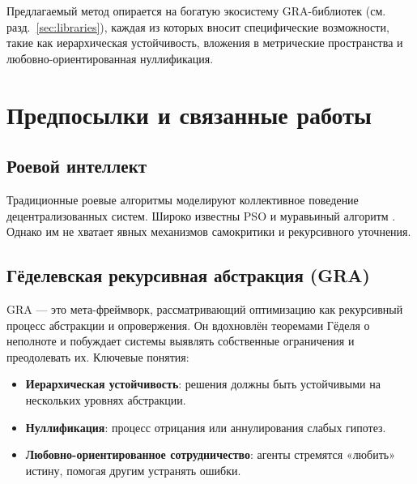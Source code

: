 \documentclass[12pt,a4paper]{article}
\begin{document}
Предлагаемый метод опирается на богатую экосистему GRA-библиотек (см. разд.~\ref{sec:libraries}), каждая из которых вносит специфические возможности, такие как иерархическая устойчивость, вложения в метрические пространства и любовно-ориентированная нуллификация.

\section{Предпосылки и связанные работы}
\subsection{Роевой интеллект}
Традиционные роевые алгоритмы моделируют коллективное поведение децентрализованных систем. Широко известны PSO \cite{kennedy1995particle} и муравьиный алгоритм \cite{dorigo1999ant}. Однако им не хватает явных механизмов самокритики и рекурсивного уточнения.

\subsection{Гёделевская рекурсивная абстракция (GRA)}
GRA — это мета-фреймворк, рассматривающий оптимизацию как рекурсивный процесс абстракции и опровержения. Он вдохновлён теоремами Гёделя о неполноте и побуждает системы выявлять собственные ограничения и преодолевать их. Ключевые понятия:
\begin{itemize}
    \item \textbf{Иерархическая устойчивость}: решения должны быть устойчивыми на нескольких уровнях абстракции.
    \item \textbf{Нуллификация}: процесс отрицания или аннулирования слабых гипотез.
    \item \textbf{Любовно-ориентированное сотрудничество}: агенты стремятся «любить» истину, помогая другим устранять ошибки.
\end{itemize}
\end{document}
